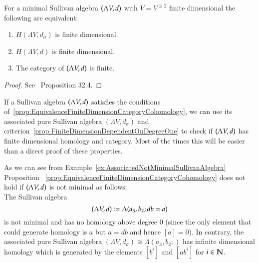  
 \begin{Proposition}
\label{prop:EquivalenceFiniteDimensionCategoryCohomology}
 For a minimal Sullivan algebra $(\Lambda V,d)$ with $V = V^{\geq 2}$ finite dimensional the following
 are equivalent:
 
 \begin{enumerate}
  \item $H(\Lambda V, d_{\sigma})$ is finite dimensional.
  \item $H(\Lambda V, d)$ is finite dimensional.
  \item The category of $(\Lambda V,d)$ is finite.
 \end{enumerate}

\end{Proposition}

\begin{proof}
 See~\cite{Felix2001} Proposition 32.4.
\end{proof}

If a Sullivan algebra $(\Lambda V,d)$ satisfies the conditions of~\ref{prop:EquivalenceFiniteDimensionCategoryCohomology},
we can use its associated pure Sullivan algebra $(\Lambda V, d_{\sigma})$ and criterion~\ref{prop:FiniteDimensionDependentOnDegreeOne}
to check if $(\Lambda V,d)$ has finite dimensional homology and category. Most of the times this will be easier than 
a direct proof of these properties.

\begin{Remark}
 As we can see from Example~\ref{ex:AssociatedNotMinimalSullivanAlgebra} Proposition 
~\ref{prop:EquivalenceFiniteDimensionCategoryCohomology} does not hold if $(\Lambda V,d)$ is not minimal as follows: \\
 The Sullivan algebra $$(\Lambda V,d) \coloneqq \Lambda( a_3, b_2 ; db = a)$$ is not minimal and 
 has no homology above degree $0$ (since
 the only element that could generate homology is $a$ but $a = db$ and hence $[a] = 0$). In contrary, the associated
 pure Sullivan algebra $ (\Lambda V, d_{\sigma}) \cong \Lambda (a_3, b_2 ;)$ has infinite dimensional homology which is 
 generated by the elements
 $[b^i]$ and $[ab^i]$ for $i \in \mathbb{N}$.
\end{Remark}
